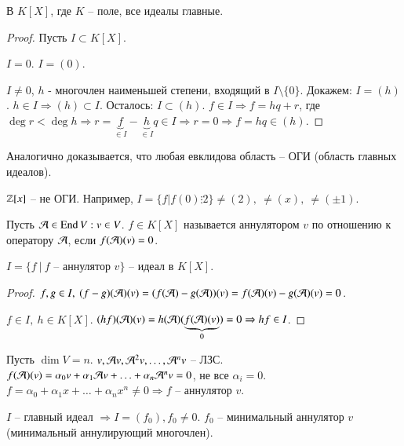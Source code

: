 \documentclass[main]{subfiles}
\begin{document}
\begin{corollary}
    В $K[X]$, где $K$ -- поле, все идеалы главные.
\end{corollary}

\begin{proof}
    Пусть $I \subset K[X]$.

    $I = 0$. $I = (0)$.

    $I \neq 0 $, $h$ - многочлен наименьшей степени, входящий в $I\setminus \{0\}$.
    Докажем: $I = (h)$. $h \in I \Rightarrow (h) \subset I$.
    Осталось: $I \subset (h)$. $f \in I \Rightarrow f=hq+r$, где $\deg r < \deg h
        \Rightarrow r = \underbrace{f}_{\in I} - \underbrace{h}_{\in I} q \in I \Rightarrow r = 0 \Rightarrow f = hq \in (h)$.
\end{proof}

\begin{remark}
    Аналогично доказывается, что любая евклидова область -- ОГИ (область главных идеалов).
\end{remark}

\begin{remark}
    $\mathbb{Z}[x]$ -- не ОГИ. Например, $I = \{f|f(0) \vdots 2\} \neq (2),\ \neq (x),\ \neq (\pm 1)$.
\end{remark}

\begin{definition} [Аннулятор]
    Пусть $\mathcal{A} \in \operatorname{End} V : v\in V$. $f \in K[X]$ называется аннулятором $v$ по отношению к оператору $\mathcal{A}$, если $f(\mathcal{A})(v) = 0$.
\end{definition}

\begin{lemma}
    $I = \{f \ | \ f$ -- аннулятор $v \}$ -- идеал в $K[X]$.
\end{lemma}

\begin{proof}
    $f, g \in I,\ (f-g)(\mca)(v) = (f(\mca)-g(\mca))(v) = f(\mca)(v) - g(\mca)(v) = 0$.

    $f \in I,\ h \in K[X]$. $(hf)(\mathcal{A})(v) = h(\mathcal{A})(\underbrace{f(\mathcal{A})(v)}_{0}) = 0 \Rightarrow hf \in I$.
\end{proof}

Пусть $\dim V = n$. $v, \mathcal{A} v, {\mathcal{A}}^2 v, \ldots, {\mathcal{A}}^n v$ -- ЛЗС.
$f(\mathcal{A})(v) = \alpha_0 v + \alpha_1 \mathcal{A} v + \ldots + \alpha_n {\mathcal{A}}^n v = 0$, не все $\alpha_i =0$.
$f = \alpha_0 + \alpha_1 x + \ldots + \alpha_n x^n \neq 0 \Rightarrow f$ -- аннулятор $v$.

$I$ -- главный идеал $\Rightarrow I=(f_0), f_0 \neq 0$. $f_0$ -- минимальный аннулятор $v$ (минимальный аннулирующий многочлен).
\end{document}

